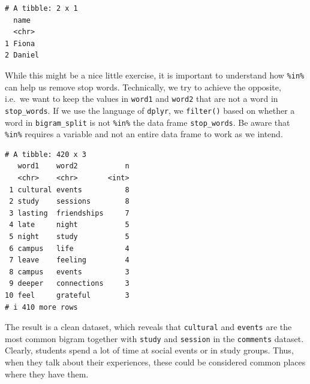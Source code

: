 \documentclass[
  letterpaper,
]{krantz}
\makeatletter
\newenvironment{Shaded}{\begin{snugshade}}{\end{snugshade}}
\newcommand{\AttributeTok}[1]{\textcolor[rgb]{0.40,0.45,0.13}{#1}}
\newcommand{\ConstantTok}[1]{\textcolor[rgb]{0.56,0.35,0.01}{#1}}
\newcommand{\FunctionTok}[1]{\textcolor[rgb]{0.28,0.35,0.67}{#1}}
\newcommand{\NormalTok}[1]{\textcolor[rgb]{0.00,0.23,0.31}{#1}}
\newcommand{\OtherTok}[1]{\textcolor[rgb]{0.00,0.23,0.31}{#1}}
\newcommand{\SpecialCharTok}[1]{\textcolor[rgb]{0.37,0.37,0.37}{#1}}
\newenvironment{kframe}{%
\medskip{}
\setlength{\fboxsep}{.8em}
 \def\at@end@of@kframe{}%
 \ifinner\ifhmode%
  \def\at@end@of@kframe{\end{minipage}}%
  \begin{minipage}{\columnwidth}%
 \fi\fi%
 \def\FrameCommand##1{\hskip\@totalleftmargin \hskip-\fboxsep
 \colorbox{shadecolor}{##1}\hskip-\fboxsep
     \hskip-\linewidth \hskip-\@totalleftmargin \hskip\columnwidth}%
 \MakeFramed {\advance\hsize-\width
   \@totalleftmargin\z@ \linewidth\hsize
   \@setminipage}}%
 {\par\unskip\endMakeFramed%
 \at@end@of@kframe}
\renewenvironment{Shaded}{\begin{kframe}}{\end{kframe}}
\makeatother
\begin{document}
\begin{verbatim}
# A tibble: 2 x 1
  name  
  <chr> 
1 Fiona 
2 Daniel
\end{verbatim}

While this might be a nice little exercise, it is important to
understand how \texttt{\%in\%} can help us remove stop words.
Technically, we try to achieve the opposite, i.e.~we want to keep the
values in \texttt{word1} and \texttt{word2} that are not a word in
\texttt{stop\_words}. If we use the language of \texttt{dplyr}, we
\texttt{filter()} based on whether a word in \texttt{bigram\_split} is
not \texttt{\%in\%} the data frame \texttt{stop\_words}. Be aware that
\texttt{\%in\%} requires a variable and not an entire data frame to work
as we intend.

\begin{Shaded}
\end{Shaded}

\begin{verbatim}
# A tibble: 420 x 3
   word1    word2           n
   <chr>    <chr>       <int>
 1 cultural events          8
 2 study    sessions        8
 3 lasting  friendships     7
 4 late     night           5
 5 night    study           5
 6 campus   life            4
 7 leave    feeling         4
 8 campus   events          3
 9 deeper   connections     3
10 feel     grateful        3
# i 410 more rows
\end{verbatim}

The result is a clean dataset, which reveals that \texttt{cultural} and
\texttt{events} are the most common bigram together with \texttt{study}
and \texttt{session} in the \texttt{comments} dataset. Clearly, students
spend a lot of time at social events or in study groups. Thus, when they
talk about their experiences, these could be considered common places
where they have them.
\end{document}
